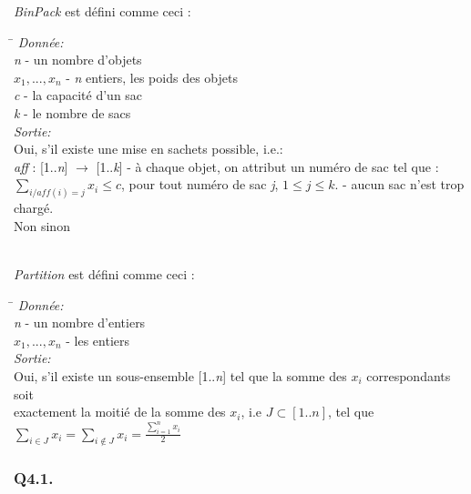 \textit{BinPack} est défini comme ceci :
	\begin{tabbing}
		\hspace{1cm}\=\kill
		\textit{Donnée:}\\
			\>\textit{n} - un nombre d'objets\\
			\>\textit{$x_{1},...,x_{n}$} - \textit{n} entiers, les poids des objets\\
			\>\textit{c} - la capacité d'un sac\\
			\>\textit{k} - le nombre de sacs\\
		\textit{Sortie:}\\
			\>Oui, s'il existe une mise en sachets possible, i.e.:\\
			\>\textit{aff} : [1..\textit{n}] $\rightarrow$ [1..\textit{k}] - à chaque objet, on attribut un numéro de sac tel que :\\
			\>$\sum\nolimits_{i/aff(i)=j} x_{i} \leq c$, pour tout numéro de sac \textit{j}, $1 \leq j \leq k$. - aucun sac n'est trop chargé.\\
			\>Non sinon
	\end{tabbing}
~\\
\textit{Partition} est défini comme ceci :
	\begin{tabbing}
		\hspace{1cm}\=\kill
		\textit{Donnée:}\\
			\>\textit{n} - un nombre d'entiers\\
			\>\textit{$x_{1},...,x_{n}$} - les entiers\\
		\textit{Sortie:}\\
			\>Oui, s'il existe un sous-ensemble [1..\textit{n}] tel que la somme des $x_{i}$ correspondants soit\\
			\>exactement la moitié de la somme des $x_{i}$, i.e $J \subset [1..n]$, tel que\\
			\>$\sum\nolimits_{i \in J} x_{i} = \sum\nolimits_{i \notin J} x_{i} = \frac{\sum\nolimits_{i = 1}^{n} x_{i}}{2}$
	\end{tabbing}

\subsubsection{Q4.1.}

